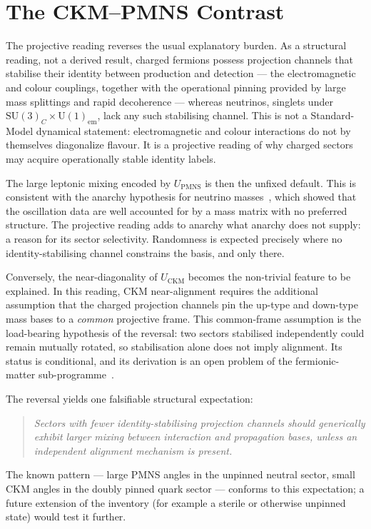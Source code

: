 \documentclass[11pt,a4paper]{article}
\theoremstyle{definition}
\newcommand{\SU}{\mathrm{SU}}
\newcommand{\UU}{\mathrm{U}}
\newcommand{\Upmns}{U_{\mathrm{PMNS}}}
\newcommand{\Uckm}{U_{\mathrm{CKM}}}
\begin{document}
  \section{The CKM--PMNS Contrast}
    \label{sec:ckm-pmns}

    The projective reading reverses the usual explanatory burden.
    As a structural reading, not a derived result, charged fermions possess projection channels that stabilise
    their identity between production and detection --- the electromagnetic and colour couplings, together with
    the operational pinning provided by large mass splittings and rapid decoherence --- whereas neutrinos,
    singlets under $\SU(3)_C \times \UU(1)_{\mathrm{em}}$, lack any such stabilising channel.
    This is not a Standard-Model dynamical statement: electromagnetic and colour interactions do not by
    themselves diagonalize flavour.
    It is a projective reading of why charged sectors may acquire operationally stable identity labels.

    The large leptonic mixing encoded by $\Upmns$ is then the unfixed default.
    This is consistent with the anarchy hypothesis for neutrino masses~\cite{HallMurayamaWeiner2000}, which
    showed that the oscillation data are well accounted for by a mass matrix with no preferred structure.
    The projective reading adds to anarchy what anarchy does not supply: a reason for its sector selectivity.
    Randomness is expected precisely where no identity-stabilising channel constrains the basis, and only there.

    Conversely, the near-diagonality of $\Uckm$ becomes the non-trivial feature to be explained.
    In this reading, CKM near-alignment requires the additional assumption that the charged projection channels
    pin the up-type and down-type mass bases to a \emph{common} projective frame.
    This common-frame assumption is the load-bearing hypothesis of the reversal: two sectors stabilised
    independently could remain mutually rotated, so stabilisation alone does not imply alignment.
    Its status is conditional, and its derivation is an open problem of the fermionic-matter
    sub-programme~\cite{Beau2026fmnote}.

    The reversal yields one falsifiable structural expectation:
    \begin{quote}
      \emph{Sectors with fewer identity-stabilising projection channels should generically exhibit larger mixing
      between interaction and propagation bases, unless an independent alignment mechanism is present.}
    \end{quote}
    The known pattern --- large PMNS angles in the unpinned neutral sector, small CKM angles in the doubly
    pinned quark sector --- conforms to this expectation; a future extension of the inventory (for example a
    sterile or otherwise unpinned state) would test it further.
\end{document}
